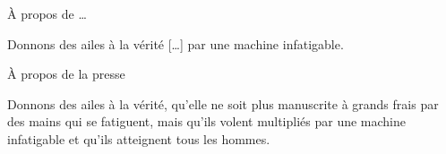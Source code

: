 \begin{frame}{À propos de \ldots}
\begin{coolquote}
Donnons des ailes à la vérité [\ldots] par une machine infatigable.
\end{coolquote}
\end{frame}
\begin{frame}{À propos de la presse}
\begin{coolquote}[Gutenberg, 1455]
Donnons des ailes à la vérité, qu'elle ne soit plus manuscrite à grands frais par des mains qui se fatiguent, mais qu'ils volent multipliés par une machine infatigable et qu'ils atteignent tous les hommes.
\end{coolquote}
\end{frame}



